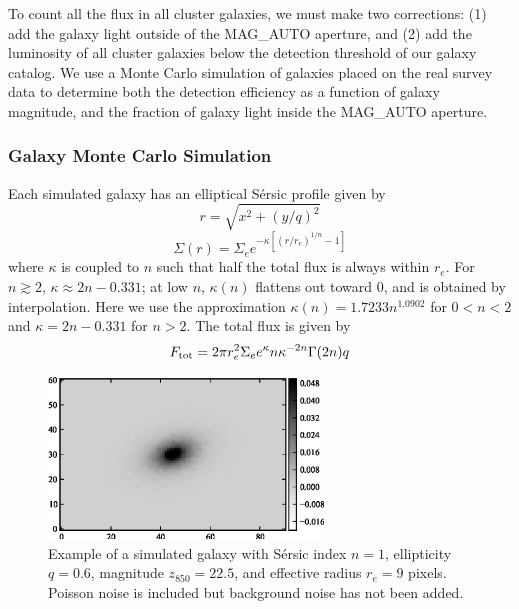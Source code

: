 

To count all the flux in all cluster galaxies, we must make two
corrections: (1) add the galaxy light outside of the MAG\_AUTO
aperture, and (2) add the luminosity of all cluster galaxies below the
detection threshold of our galaxy catalog. We use a Monte Carlo
simulation of galaxies placed on the real survey data to determine
both the detection efficiency as a function of galaxy magnitude, and
the fraction of galaxy light inside the MAG\_AUTO aperture. 

\subsubsection{Galaxy Monte Carlo Simulation}

Each simulated galaxy has an elliptical S{\'e}rsic profile
given by
\begin{equation}
r = \sqrt{x^2 + (y/q)^2}
\end{equation}
\begin{equation}
\Sigma(r) = \Sigma_e e^{-\kappa [(r/r_e)^{1/n}-1]}
\end{equation}
where $\kappa$ is coupled to $n$ such that half the total flux is
always within $r_e$. For $n \gtrsim 2$, $\kappa \approx 2n - 0.331$;
at low $n$, $\kappa(n)$ flattens out toward 0, and is obtained by
interpolation. Here we use the approximation $\kappa(n)=1.7233
n^{1.0902}$ for $0<n<2$ and $\kappa = 2n -0.331$ for $n>2$. The total
flux is given by
\begin{equation}
F_{\rm tot} = 2\pi r_e^2 \Sigma_e e^\kappa n \kappa^{-2n} \Gamma(2n)q
\end{equation}
\newpage

\begin{figure}
\includegraphics[width=0.65\textwidth]{figures/clrate/onesimgal.eps}
\caption[Example of a simulated galaxy]{Example of a simulated galaxy
with S{\'e}rsic index $n=1$, ellipticity $q=0.6$, magnitude $z_{850} =
  22.5$, and effective radius $r_e = 9$ pixels. Poisson noise is
  included but background noise has not been
  added. \label{fig:onesimgal}}
\end{figure}

